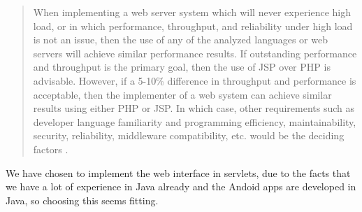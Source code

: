 \begin{quotation}
When implementing a web server system which will never experience high load, or in
which performance, throughput, and reliability under high load is not an issue, then
the use of any of the analyzed languages or web servers will achieve similar
performance results. If outstanding performance and throughput is the primary goal,
then the use of JSP over PHP is advisable. However, if a 5-10\% difference in
throughput and performance is acceptable, then the implementer of a web system can
achieve similar results using either PHP or JSP. In which case, other requirements
such as developer language familiarity and programming efficiency, maintainability,
security, reliability, middleware compatibility, etc. would be the deciding factors \cite[p. 181]{servletVsPHP}.
\end{quotation}

We have chosen to implement the web interface in servlets, due to the facts that we have a lot of experience in Java already and the Andoid apps are developed in Java, so choosing this seems fitting.